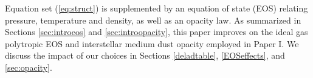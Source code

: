 Equation set (\ref{eq:struct}) is supplemented by an equation of state (EOS) relating pressure, temperature and density, as well as an opacity law.  As summarized in Sections \ref{sec:introeos} and \ref{sec:introopacity}, this paper improves on the ideal gas polytropic EOS and interstellar medium dust opacity employed in Paper I.  We discuss the impact of our choices in Sections  \ref{deladtable}, \ref{EOSeffects}, and \ref{sec:opacity}.

%
%



